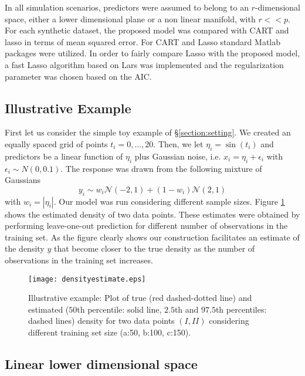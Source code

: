 \documentclass{article} %
\begin{document}
In all simulation scenarios, predictors were assumed to belong to an $r$-dimensional space, either a lower dimensional plane or a non linear manifold, with $r<<p$. For each synthetic dataset, the proposed model was compared with CART and lasso in terms of mean squared error. For CART and Lasso standard Matlab packages were utilized. In order to fairly compare Lasso with the proposed model, a fast Lasso algorithm based on Lars was implemented and the regularization parameter was chosen based on  the AIC. 

\subsection{Illustrative Example}
First let us consider the simple toy example of \S \ref{section:setting}. We created an equally spaced grid of points $t_i=0, \ldots, 20$. Then, we let $\eta_i=\sin(t_i)$ and predictors be a linear function of $\eta_i$ plus Gaussian noise, i.e. $x_i=\eta_i + \epsilon_i$ with $\epsilon_i \sim N(0,0.1)$. The response was drawn from the following mixture of Gaussians
\begin{equation}
y_i \sim w_i \mathcal{N}(-2,1) + (1-w_i) \mathcal{N}(2,1) 
\end{equation}
with $w_i=|\eta_i|$. Our model was run considering different sample sizes. Figure \ref{plotDensity} shows the estimated density of two data points. These estimates were obtained by performing leave-one-out prediction for different number of observations in the training set. As the figure clearly shows our construction facilitates an estimate of the density $y$ that become closer to the true density as the number of observations in the training set increases.




\begin{figure}[h!]
\centering
\texttt{[image: densityestimate.eps]}
\caption{Illustrative example: Plot of true (red dashed-dotted line) and estimated ($50$th percentile: solid line, $2.5$th and $97.5$th percentiles: dashed lines) density for two data points $(I, II)$ considering different training set size (a:50, b:100, c:150). } \label{plotDensity}
\end{figure}


\subsection{Linear lower dimensional space} \label{section:linear}
\end{document}
